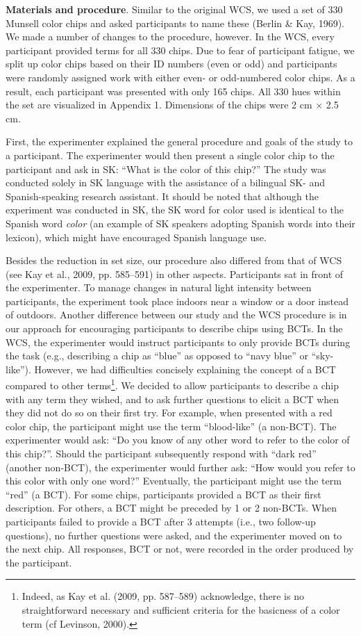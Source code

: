 \documentclass[
  english,
  ,man,floatsintext]{apa6}
\begin{document}
\textbf{Materials and procedure}. Similar to the original WCS, we used a set of 330 Munsell color chips and asked participants to name these (Berlin \& Kay, 1969). We made a number of changes to the procedure, however. In the WCS, every participant provided terms for all 330 chips. Due to fear of participant fatigue, we split up color chips based on their ID numbers (even or odd) and participants were randomly assigned work with either even- or odd-numbered color chips. As a result, each participant was presented with only 165 chips. All 330 hues within the set are visualized in Appendix 1. Dimensions of the chips were 2 cm × 2.5 cm.

First, the experimenter explained the general procedure and goals of the study to a participant. The experimenter would then present a single color chip to the participant and ask in SK: \enquote{What is the color of this chip?} The study was conducted solely in SK language with the assistance of a bilingual SK- and Spanish-speaking research assistant. It should be noted that although the experiment was conducted in SK, the SK word for color used is identical to the Spanish word \emph{color} (an example of SK speakers adopting Spanish words into their lexicon), which might have encouraged Spanish language use.

Besides the reduction in set size, our procedure also differed from that of WCS (see Kay et al., 2009, pp. 585--591) in other aspects. Participants sat in front of the experimenter. To manage changes in natural light intensity between participants, the experiment took place indoors near a window or a door instead of outdoors. Another difference between our study and the WCS procedure is in our approach for encouraging participants to describe chips using BCTs. In the WCS, the experimenter would instruct participants to only provide BCTs during the task (e.g., describing a chip as \enquote{blue} as opposed to \enquote{navy blue} or \enquote{sky-like}). However, we had difficulties concisely explaining the concept of a BCT compared to other terms\footnote{Indeed, as Kay et al. (2009, pp. 587--589) acknowledge, there is no straightforward necessary and sufficient criteria for the basicness of a color term (cf Levinson, 2000).}. We decided to allow participants to describe a chip with any term they wished, and to ask further questions to elicit a BCT when they did not do so on their first try. For example, when presented with a red color chip, the participant might use the term \enquote{blood-like} (a non-BCT). The experimenter would ask: \enquote{Do you know of any other word to refer to the color of this chip?}. Should the participant subsequently respond with \enquote{dark red} (another non-BCT), the experimenter would further ask: \enquote{How would you refer to this color with only one word?} Eventually, the participant might use the term \enquote{red} (a BCT). For some chips, participants provided a BCT as their first description. For others, a BCT might be preceded by 1 or 2 non-BCTs. When participants failed to provide a BCT after 3 attempts (i.e., two follow-up questions), no further questions were asked, and the experimenter moved on to the next chip. All responses, BCT or not, were recorded in the order produced by the participant.
\end{document}
